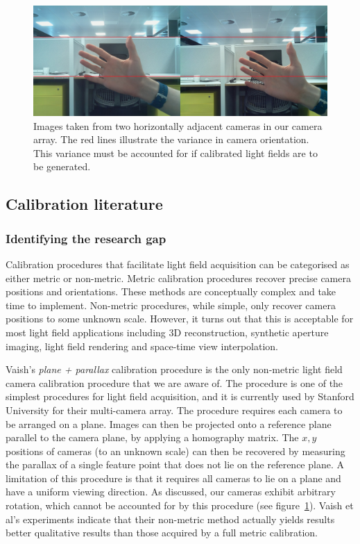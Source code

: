 \documentclass[../main.tex]{subfiles}
\begin{document}
\begin{figure}[H]
    \centering
    \includegraphics[width=\linewidth]{images/rotation-evidence}
    \caption{Images taken from two horizontally adjacent cameras in our camera array. The red lines illustrate the variance in camera orientation. This variance must be accounted for if calibrated light fields are to be generated.}
    \label{fig:rotation-evidence}
\end{figure}

\subsection{Calibration literature}
\subsubsection{Identifying the research gap}
Calibration procedures that facilitate light field acquisition can be categorised as either metric or non-metric. Metric calibration procedures recover precise camera positions and orientations. These methods are conceptually complex and take time to implement. Non-metric procedures, while simple, only recover camera positions to some unknown scale. However, it turns out that this is acceptable for most light field applications including 3D reconstruction, synthetic aperture imaging, light field rendering and space-time view interpolation. 

Vaish's \emph{plane + parallax} calibration procedure is the only non-metric light field camera calibration procedure that we are aware of. The procedure is one of the simplest procedures for light field acquisition, and it is currently used by Stanford University for their multi-camera array. The procedure requires each camera to be arranged on a plane. Images can then be projected onto a reference plane parallel to the camera plane, by applying a homography matrix. The $x,y$ positions of cameras (to an unknown scale) can then be recovered by measuring the parallax of a single feature point that does not lie on the reference plane. A limitation of this procedure is that it requires all cameras to lie on a plane and have a uniform viewing direction. As discussed, our cameras exhibit arbitrary rotation, which cannot be accounted for by this procedure (see figure~\ref{fig:rotation-evidence}). Vaish et al's experiments indicate that their non-metric method actually yields results better qualitative results than those acquired by a full metric calibration.
\end{document}
